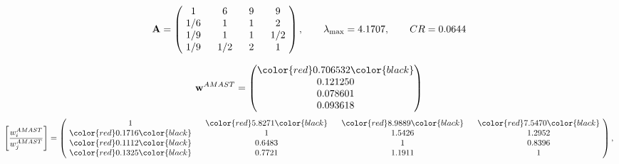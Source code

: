 \begin{example}
\begin{equation*}
\mathbf{A} =
\begin{pmatrix}
$\,\,$ 1 $\,\,$ & $\,\,$6$\,\,$ & $\,\,$9$\,\,$ & $\,\,$9 $\,\,$ \\
$\,\,$ 1/6$\,\,$ & $\,\,$ 1 $\,\,$ & $\,\,$1$\,\,$ & $\,\,$2 $\,\,$ \\
$\,\,$ 1/9$\,\,$ & $\,\,$ 1 $\,\,$ & $\,\,$ 1 $\,\,$ & $\,\,$ 1/2 $\,\,$ \\
$\,\,$ 1/9$\,\,$ & $\,\,$ 1/2$\,\,$ & $\,\,$2$\,\,$ & $\,\,$ 1  $\,\,$ \\
\end{pmatrix},
\qquad
\lambda_{\max} =
4.1707,
\qquad
CR = 0.0644
\end{equation*}

\begin{equation*}
\mathbf{w}^{AMAST} =
\begin{pmatrix}
\color{red} 0.706532\color{black} \\
0.121250\\
0.078601\\
0.093618
\end{pmatrix}\end{equation*}
\begin{equation*}
\left[ \frac{{w}^{AMAST}_i}{{w}^{AMAST}_j} \right] =
\begin{pmatrix}
$\,\,$ 1 $\,\,$ & $\,\,$\color{red} 5.8271\color{black} $\,\,$ & $\,\,$\color{red} 8.9889\color{black} $\,\,$ & $\,\,$\color{red} 7.5470\color{black} $\,\,$ \\
$\,\,$\color{red} 0.1716\color{black} $\,\,$ & $\,\,$ 1 $\,\,$ & $\,\,$1.5426$\,\,$ & $\,\,$1.2952  $\,\,$ \\
$\,\,$\color{red} 0.1112\color{black} $\,\,$ & $\,\,$0.6483$\,\,$ & $\,\,$ 1 $\,\,$ & $\,\,$0.8396 $\,\,$ \\
$\,\,$\color{red} 0.1325\color{black} $\,\,$ & $\,\,$0.7721$\,\,$ & $\,\,$1.1911$\,\,$ & $\,\,$ 1  $\,\,$ \\
\end{pmatrix},
\end{equation*}


\end{example}
